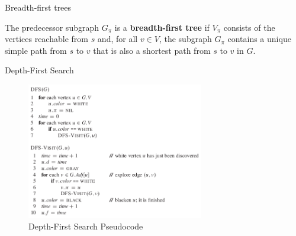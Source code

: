 \documentclass[ignorenonframetext,]{beamer}
\begin{document}
\begin{frame}{Breadth-first trees}
\protect\hypertarget{breadth-first-trees}{}

The predecessor subgraph \(G_{\pi}\) is a \textbf{breadth-ﬁrst tree} if
\(V_{\pi}\) consists of the vertices reachable from \(s\) and, for all
\(v \in V\), the subgraph \(G_{\pi}\) contains a unique simple path from
\(s\) to \(v\) that is also a shortest path from \(s\) to \(v\) in
\(G\).

\end{frame}

\begin{frame}{Depth-First Search}
\protect\hypertarget{depth-first-search}{}

\begin{figure}
\centering
\includegraphics[width=\textwidth,height=2.34375in]{depth-first-search-pseudocode.png}
\caption{Depth-First Search Pseudocode}
\end{figure}

\end{frame}
\end{document}

